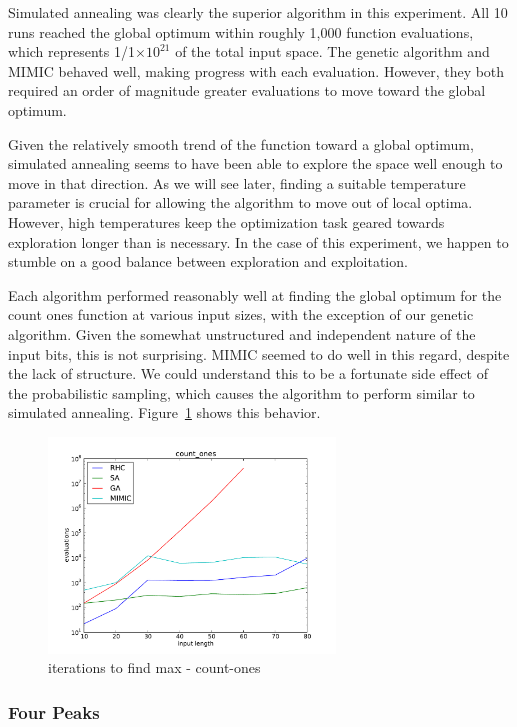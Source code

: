 \documentclass{sig-alternate}
\providecommand{\e}[1]{\ensuremath{\times 10^{#1}}}
\begin{document}
Simulated annealing was clearly the superior algorithm in this experiment. All 10 runs reached the global optimum within roughly 1,000 function evaluations, which represents 1/1\e{21} of the total input space. The genetic algorithm and MIMIC behaved well, making progress with each evaluation. However, they both required an order of magnitude greater evaluations to move toward the global optimum.

Given the relatively smooth trend of the function toward a global optimum, simulated annealing seems to have been able to explore the space well enough to move in that direction. As we will see later, finding a suitable temperature parameter is crucial for allowing the algorithm to move out of local optima. However, high temperatures keep the optimization task geared towards exploration longer than is necessary. In the case of this experiment, we happen to stumble on a good balance between exploration and exploitation.



Each algorithm performed reasonably well at finding the global optimum for the count ones function at various input sizes, with the exception of our genetic algorithm. Given the somewhat unstructured and independent nature of the input bits, this is not surprising. MIMIC seemed to do well in this regard, despite the lack of structure. We could understand this to be a fortunate side effect of the probabilistic sampling, which causes the algorithm to perform similar to simulated annealing. Figure~\ref{max-count-ones} shows this behavior.

\begin{figure}[!htbp]
    \centering
    \includegraphics[width=3in]{part1.2/count-ones-max.pdf}
    \caption{iterations to find max - count-ones\label{max-count-ones}}
\end{figure} 


\subsubsection{Four Peaks}
\end{document}
